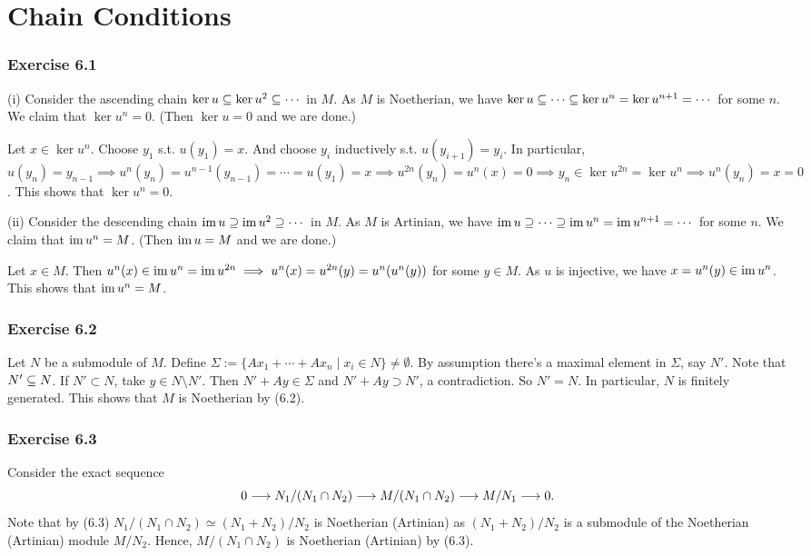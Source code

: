 \documentclass[../A&M.tex]{subfiles}
\begin{document}
\chapter{Chain Conditions}

\subsection*{Exercise 6.1}

(i) Consider the ascending chain $\ker u \subseteq \ker u^2 \subseteq \cdots$ in $M$. As $M$ is Noetherian, we have $\ker u \subseteq \cdots \subseteq \ker u^n = \ker u^{n+1} = \cdots$ for some $n$. We claim that $\ker u^n = 0$. (Then $\ker u = 0$ and we are done.)

Let $x\in\ker u^n$. Choose $y_1$ s.t. $u(y_1) = x$. And choose $y_i$ inductively s.t. $u(y_{i+1}) = y_i$. In particular, $u(y_n) = y_{n-1} \implies u^n(y_n) = u^{n-1}(y_{n-1}) = \cdots = u(y_1) = x \implies u^{2n}(y_n) = u^n(x) = 0 \implies y_n \in \ker u^{2n} = \ker u^n \implies u^n(y_n) = x = 0$. This shows that $\ker u^n = 0$.

(ii) Consider the descending chain $\operatorname{im} u \supseteq \operatorname{im} u^2 \supseteq \cdots$ in $M$. As $M$ is Artinian, we have $\operatorname{im} u \supseteq \cdots \supseteq \operatorname{im} u^n = \operatorname{im} u^{n+1} = \cdots$ for some $n$. We claim that $\operatorname{im} u^n = M$. (Then $\operatorname{im} u = M$ and we are done.)

Let $x\in M$. Then $u^n(x) \in \operatorname{im} u^n = \operatorname{im} u^{2n} \implies u^n(x) = u^{2n}(y) = u^n(u^n(y))$ for some $y\in M$. As $u$ is injective, we have $x = u^n(y) \in \operatorname{im} u^n$.  This shows that $\operatorname{im} u^n = M$.

\subsection*{Exercise 6.2}

Let $N$ be a submodule of $M$. Define $\Sigma := \{ Ax_1+\cdots+Ax_n \mid x_i \in N \} \neq \emptyset$. By assumption there's a maximal element in $\Sigma$, say $N'$. Note that $N' \subseteq N$. If $N'\subset N$, take $y \in N \setminus N'$. Then $N'+Ay \in \Sigma$ and $N'+Ay \supset N'$, a contradiction. So $N' = N$. In particular, $N$ is finitely generated. This shows that $M$ is Noetherian by (6.2).

\subsection*{Exercise 6.3}

Consider the exact sequence
$$
0 \longrightarrow N_1/(N_1\cap N_2) \longrightarrow M/(N_1\cap N_2) \longrightarrow M/N_1 \longrightarrow 0.
$$
Note that by (6.3) $N_1/(N_1\cap N_2) \simeq (N_1+N_2)/N_2$ is Noetherian (Artinian) as $(N_1+N_2)/N_2$ is a submodule of the Noetherian (Artinian) module $M/N_2$. Hence, $M/(N_1\cap N_2)$ is Noetherian (Artinian) by (6.3). 
\end{document}
